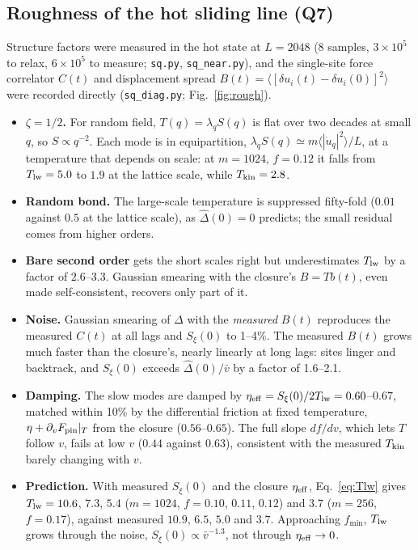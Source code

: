 \documentclass[10pt,a4paper]{article}
\begin{document}
\subsection{Roughness of the hot sliding line (Q7)}
\label{sec:rough}
Structure factors were measured in the hot state at $L=2048$ (8 samples, $3\times10^5$ to relax, $6\times10^5$ to measure; \texttt{sq.py}, \texttt{sq\_near.py}), and the single-site force correlator $C(t)$ and displacement spread $B(t)=\langle[\delta u_i(t)-\delta u_i(0)]^2\rangle$ were recorded directly (\texttt{sq\_diag.py}; Fig.~\ref{fig:rough}).
\begin{itemize}
\item \textbf{$\zeta=1/2$.} For random field, $T(q)=\lambda_qS(q)$ is flat over two decades at small $q$, so $S\propto q^{-2}$. Each mode is in equipartition, $\lambda_qS(q)\simeq m\langle|\dot u_q|^2\rangle/L$, at a temperature that depends on scale: at $m=1024$, $f=0.12$ it falls from $T_{\rm lw}=5.0$ to $1.9$ at the lattice scale, while $T_{\rm kin}=2.8$.
\item \textbf{Random bond.} The large-scale temperature is suppressed fifty-fold ($0.01$ against $0.5$ at the lattice scale), as $\hat\Delta(0)=0$ predicts; the small residual comes from higher orders.
\item \textbf{Bare second order} gets the short scales right but underestimates $T_{\rm lw}$ by a factor of $2.6$--$3.3$. Gaussian smearing with the closure's $B=Tb(t)$, even made self-consistent, recovers only part of it.
\item \textbf{Noise.} Gaussian smearing of $\Delta$ with the \emph{measured} $B(t)$ reproduces the measured $C(t)$ at all lags and $S_\xi(0)$ to 1--4\%. The measured $B(t)$ grows much faster than the closure's, nearly linearly at long lags: sites linger and backtrack, and $S_\xi(0)$ exceeds $\hat\Delta(0)/\bar v$ by a factor of 1.6--2.1.
\item \textbf{Damping.} The slow modes are damped by $\eta_{\rm eff}=S_\xi(0)/2T_{\rm lw}=0.60$--$0.67$, matched within 10\% by the differential friction at fixed temperature, $\eta+\partial_vF_{\rm pin}|_T$ from the closure ($0.56$--$0.65$). The full slope $df/dv$, which lets $T$ follow $v$, fails at low $v$ ($0.44$ against $0.63$), consistent with the measured $T_{\rm kin}$ barely changing with $v$.
\item \textbf{Prediction.} With measured $S_\xi(0)$ and the closure $\eta_{\rm eff}$, Eq.~\eqref{eq:Tlw} gives $T_{\rm lw}=10.6$, $7.3$, $5.4$ ($m=1024$, $f=0.10$, $0.11$, $0.12$) and $3.7$ ($m=256$, $f=0.17$), against measured $10.9$, $6.5$, $5.0$ and $3.7$. Approaching $f_{\min}$, $T_{\rm lw}$ grows through the noise, $S_\xi(0)\propto\bar v^{-1.3}$, not through $\eta_{\rm eff}\to0$.
\end{itemize}
\end{document}
